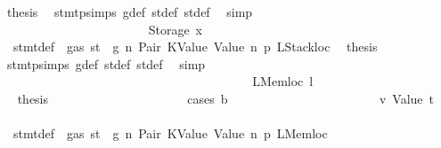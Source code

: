 \begin{isabellebody}
\ {\isacharquery}{\kern0pt}thesis\ \isamarkupfalse%
\ stmt{\isachardot}{\kern0pt}psimps{\isacharparenleft}{\kern0pt}{}{\isacharparenright}{\kern0pt}\ g{\isacharunderscore}{\kern0pt}def\ st{\isacharprime}{\kern0pt}{\isacharunderscore}{\kern0pt}def\ st{\isacharprime}{\kern0pt}{\isacharprime}{\kern0pt}{\isacharunderscore}{\kern0pt}def\ \isamarkupfalse%
\ simp\isanewline
\ \ \ \ \ \ \ \ \ \ \ \ \ \ \ \ \ \ \ \ \isamarkupfalse%
\isanewline
\ \ \ \ \ \ \ \ \ \ \ \ \ \ \ \ \ \ \ \ \ \ \isamarkupfalse%
\ {\isacharparenleft}{\kern0pt}Storage\ x{}{\isacharparenright}{\kern0pt}\isanewline
\ \ \ \ \ \ \ \ \ \ \ \ \ \ \ \ \ \ \ \ \ \ \isamarkupfalse%
\ {}{\isacharparenleft}{\kern0pt}{}{\isacharparenright}{\kern0pt}\ stmt{\isacharunderscore}{\kern0pt}def\ {\isacharbackquoteopen}{\isasymnot}\ gas\ st\ {\isasymle}\ g{\isacharbackquoteclose}\ n\ Pair\ KValue\ Value\ n{}\ p{}\ LStackloc\ \isamarkupfalse%
\ {\isacharquery}{\kern0pt}thesis\ \isamarkupfalse%
\ stmt{\isachardot}{\kern0pt}psimps{\isacharparenleft}{\kern0pt}{}{\isacharparenright}{\kern0pt}\ g{\isacharunderscore}{\kern0pt}def\ st{\isacharprime}{\kern0pt}{\isacharunderscore}{\kern0pt}def\ st{\isacharprime}{\kern0pt}{\isacharprime}{\kern0pt}{\isacharunderscore}{\kern0pt}def\ \isamarkupfalse%
\ simp\isanewline
\ \ \ \ \ \ \ \ \ \ \ \ \ \ \ \ \ \ \ \ \isamarkupfalse%
\isanewline
\ \ \ \ \ \ \ \ \ \ \ \ \ \ \ \ \ \ \isamarkupfalse%
\isanewline
\ \ \ \ \ \ \ \ \ \ \ \ \ \ \ \ \ \ \ \ \isamarkupfalse%
\ {\isacharparenleft}{\kern0pt}LMemloc\ l{\isacharparenright}{\kern0pt}\isanewline
\ \ \ \ \ \ \ \ \ \ \ \ \ \ \ \ \ \ \ \ \isamarkupfalse%
\ \isamarkupfalse%
\ {\isacharquery}{\kern0pt}thesis\isanewline
\ \ \ \ \ \ \ \ \ \ \ \ \ \ \ \ \ \ \ \ \isamarkupfalse%
\ {\isacharparenleft}{\kern0pt}cases\ b{\isacharparenright}{\kern0pt}\isanewline
\ \ \ \ \ \ \ \ \ \ \ \ \ \ \ \ \ \ \ \ \ \ \isamarkupfalse%
\ v{}{\isacharcolon}{\kern0pt}\ {\isacharparenleft}{\kern0pt}Value\ t{\isacharprime}{\kern0pt}{\isacharparenright}{\kern0pt}\isanewline
\ \ \ \ \ \ \ \ \ \ \ \ \ \ \ \ \ \ \ \ \ \ \isamarkupfalse%
\ {}{\isacharparenleft}{\kern0pt}{}{\isacharparenright}{\kern0pt}\ stmt{\isacharunderscore}{\kern0pt}def\ {\isacharbackquoteopen}{\isasymnot}\ gas\ st\ {\isasymle}\ g{\isacharbackquoteclose}\ n\ Pair\ KValue\ Value\ n{}\ p{}\ LMemloc\ \isamarkupfalse%

\end{isabellebody}
